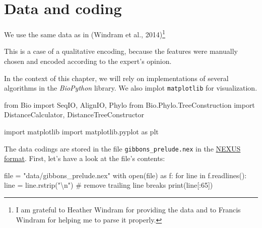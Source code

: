 \documentclass[
  a4paperpaper,
  ,captions=tableheading
]{scrbook}
\newenvironment{Shaded}{\begin{snugshade}}{\end{snugshade}}
\newcommand{\BuiltInTok}[1]{\textcolor[rgb]{0.00,0.23,0.31}{#1}}
\newcommand{\CharTok}[1]{\textcolor[rgb]{0.13,0.47,0.30}{#1}}
\newcommand{\CommentTok}[1]{\textcolor[rgb]{0.37,0.37,0.37}{#1}}
\newcommand{\ControlFlowTok}[1]{\textcolor[rgb]{0.00,0.23,0.31}{#1}}
\newcommand{\DecValTok}[1]{\textcolor[rgb]{0.68,0.00,0.00}{#1}}
\newcommand{\ImportTok}[1]{\textcolor[rgb]{0.00,0.46,0.62}{#1}}
\newcommand{\KeywordTok}[1]{\textcolor[rgb]{0.00,0.23,0.31}{#1}}
\newcommand{\NormalTok}[1]{\textcolor[rgb]{0.00,0.23,0.31}{#1}}
\newcommand{\OperatorTok}[1]{\textcolor[rgb]{0.37,0.37,0.37}{#1}}
\newcommand{\StringTok}[1]{\textcolor[rgb]{0.13,0.47,0.30}{#1}}
\begin{document}
\hypertarget{data-and-coding}{%
\section{Data and coding}\label{data-and-coding}}

We use the same data as in (Windram et al., 2014)\footnote{I am grateful
  to Heather Windram for providing the data and to Francis Windram for
  helping me to parse it properly.}

This is a case of a qualitative encoding, because the features were
manually chosen and encoded according to the expert's opinion.

In the context of this chapter, we will rely on implementations of
several algorithms in the \emph{BioPython} library. We also implot
\texttt{matplotlib} for visualization.

\begin{Shaded}
\begin{Highlighting}[]
\ImportTok{from}\NormalTok{ Bio }\ImportTok{import}\NormalTok{ SeqIO, AlignIO, Phylo}
\ImportTok{from}\NormalTok{ Bio.Phylo.TreeConstruction }\ImportTok{import}\NormalTok{ DistanceCalculator, DistanceTreeConstructor}

\ImportTok{import}\NormalTok{ matplotlib}
\ImportTok{import}\NormalTok{ matplotlib.pyplot }\ImportTok{as}\NormalTok{ plt}
\end{Highlighting}
\end{Shaded}

The data codings are stored in the file \texttt{gibbons\_prelude.nex} in
the \href{https://en.wikipedia.org/wiki/Nexus_file}{NEXUS format}.
First, let's have a look at the file's contents:

\begin{Shaded}
\begin{Highlighting}[]
\BuiltInTok{file} \OperatorTok{=} \StringTok{"data/gibbons\_prelude.nex"}
\ControlFlowTok{with} \BuiltInTok{open}\NormalTok{(}\BuiltInTok{file}\NormalTok{) }\ImportTok{as}\NormalTok{ f:}
    \ControlFlowTok{for}\NormalTok{ line }\KeywordTok{in}\NormalTok{ f.readlines():}
\NormalTok{        line }\OperatorTok{=}\NormalTok{ line.rstrip(}\StringTok{"}\CharTok{\textbackslash{}n}\StringTok{"}\NormalTok{) }\CommentTok{\# remove trailing line breaks}
        \BuiltInTok{print}\NormalTok{(line[:}\DecValTok{65}\NormalTok{])}
\end{Highlighting}
\end{Shaded}
\end{document}

